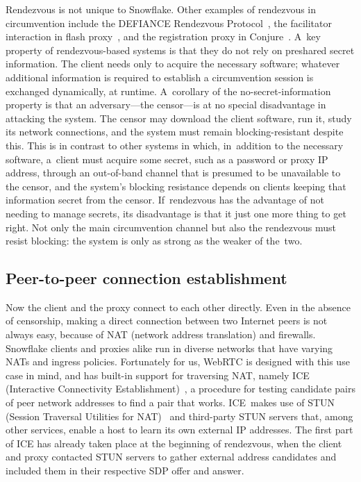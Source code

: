 \documentclass[letterpaper,twocolumn]{article}
\begin{document}
Rendezvous is not unique to Snowflake.
Other examples of rendezvous in circumvention include
the DEFIANCE Rendezvous Protocol~\cite[\S 3]{Lincoln2012a},
the facilitator interaction in flash proxy~\cite[\S 3]{Fifield2012a},
and the registration proxy in Conjure~\cite[\S 4.1]{Frolov2019b}.
A~key property of rendezvous-based systems
is that they do not rely on preshared secret information.
The client needs only to acquire the necessary software;
whatever additional information is required to establish a circumvention session
is exchanged dynamically, at runtime.
A~corollary of the no-secret-information property
is that an adversary---the censor---is
at no special disadvantage in attacking the system.
The censor may download the client software,
run it, study its network connections,
and the system must remain blocking-resistant despite this.
This is in contrast to other systems in which,
in~addition to the necessary software,
a~client must acquire some secret,
such as a password or proxy IP address,
through an out-of-band channel
that is presumed to be unavailable to the censor,
and the system's blocking resistance depends on
clients keeping that information secret from the censor.
If~rendezvous has the advantage of not needing to manage secrets,
its disadvantage is that it just one more thing to get right.
Not only the main circumvention channel
but also the rendezvous must resist blocking:
the system is only as strong as the weaker of the~two.

\subsection{Peer-to-peer connection establishment}
\label{sec:ice}

Now the client and the proxy connect to each other directly.
Even in the absence of censorship,
making a direct connection between two Internet peers is not always easy,
because of NAT (network address translation) and firewalls.
Snowflake clients and proxies alike run in diverse networks
that have varying NATs and ingress policies.
Fortunately for us,
WebRTC is designed with this use case in mind,
and has built-in support for traversing NAT, namely
ICE (Interactive Connectivity Establishment)~\cite{rfc8445},
a procedure for testing candidate pairs of peer network addresses
to find a pair that works.
ICE~makes use of
STUN (Session Traversal Utilities for NAT)~\cite{rfc8489}
and third-party STUN servers that, among other services,
enable a host to learn its own external IP addresses.
The first part of ICE has already taken place at the beginning of rendezvous,
when the client and proxy contacted STUN servers to gather
external address candidates and included them in their respective
SDP offer and answer.
\end{document}
